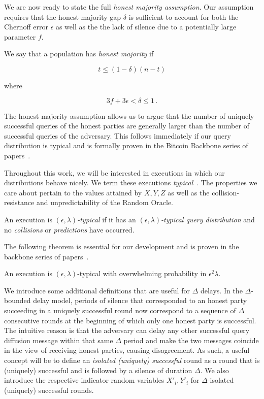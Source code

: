 We are now ready to state the full \emph{honest majority assumption}. Our
assumption requires that the honest majority gap $\delta$ is sufficient to
account for both the Chernoff error $\epsilon$ as well as the the lack of
silence due to a potentially large parameter $f$.

\begin{definition}\index{$\delta$}
  We say that a population has \emph{honest majority} if

  \[
  t \leq (1 - \delta)(n - t)
  \]

  where

  \[
  3f + 3\epsilon < \delta \leq 1\,.
  \]
\end{definition}

The honest majority assumption allows us to argue that the number of uniquely
successful queries of the honest parties are generally larger than the number of
successful queries of the adversary. This follows immediately if our query
distribution is typical and is formally proven in the Bitcoin Backbone series of
papers~\cite{backbone,varbackbone}.

Throughout this work, we will be interested in executions in which our
distributions behave nicely. We term these executions
\emph{typical}~\cite{backbone}. The properties we care about pertain to the
values attained by $X, Y, Z$ as well as the collision-resistance and
unpredictability of the Random Oracle.

\begin{definition}
  An execution is \emph{$(\epsilon, \lambda)$-typical} if it has an
  \emph{$(\epsilon, \lambda)$-typical query distribution} and no
  \emph{collisions} or \emph{predictions} have occurred.
\end{definition}

The following theorem is essential for our development and is proven in the
backbone series of papers~\cite{backbone,varbackbone}.

\begin{theorem}[Typicality]
  An execution is $(\epsilon, \lambda)$-typical with overwhelming probability
  in $\epsilon^2 \lambda$.
\end{theorem}

We introduce some additional definitions that are useful for $\Delta$ delays.
In the $\Delta$-bounded delay model, periods of silence that corresponded to
an honest party succeeding in a uniquely successful round now correspond to a
sequence of $\Delta$ consecutive rounds at the beginning of which only one
honest party is successful. The intuitive reason is that the adversary can delay
any other successful query diffusion message within that same $\Delta$ period
and make the two messages coincide in the view of receiving honest parties,
causing disagreement. As such, a useful concept will be to define an
\emph{isolated (uniquely) successful} round as a round that is (uniquely)
successful and is followed by a silence of duration $\Delta$. We also introduce
the respective indicator random variables $X'_i, Y'_i$ for $\Delta$-isolated
(uniquely) successful rounds.

